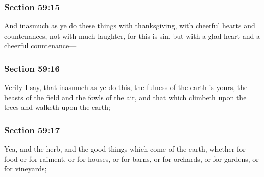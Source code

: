 	\subsubsection{Section 59:15} %
		\label{DC59-15}

		And inasmuch as ye do these things with thanksgiving, with cheerful hearts and countenances, not with much laughter, for this is sin, but with a glad heart and a cheerful countenance---


	\subsubsection{Section 59:16} %
		\label{DC59-16}

		Verily I say, that inasmuch as ye do this, the fulness of the earth is yours, the beasts of the field and the fowls of the air, and that which climbeth upon the trees and walketh upon the earth;


	\subsubsection{Section 59:17} %
		\label{DC59-17}

		Yea, and the herb, and the good things which come of the earth, whether for food or for raiment, or for houses, or for barns, or for orchards, or for gardens, or for vineyards;


